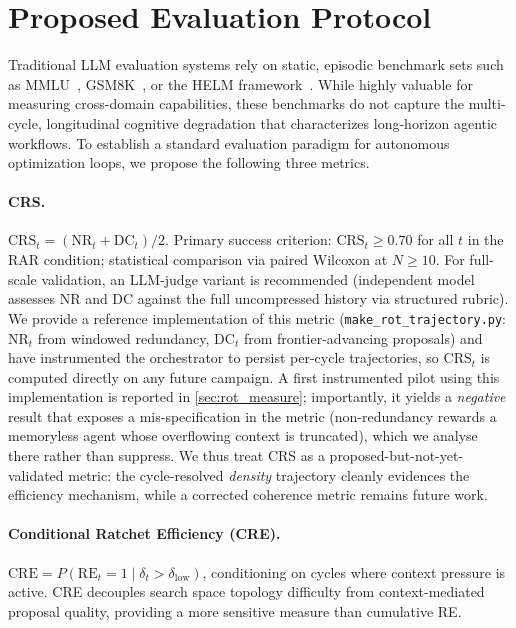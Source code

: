 \documentclass[conference]{IEEEtran}
\newcommand{\dlt}{\delta_t}
\newcommand{\dlow}{\delta_{\mathrm{low}}}
\newcommand{\CRS}{\mathrm{CRS}}
\newcommand{\RE}{\mathrm{RE}}
\newcommand{\NR}{\mathrm{NR}}
\newcommand{\DC}{\mathrm{DC}}
\newcommand{\CRE}{\mathrm{CRE}}
\begin{document}
\section{Proposed Evaluation Protocol}
\label{sec:eval}

Traditional LLM evaluation systems rely on static, episodic benchmark sets such as MMLU~\citep{hendrycks2020measuring}, GSM8K~\citep{cobbe2021training}, or the HELM framework~\citep{liang2022holistic}. While highly valuable for measuring cross-domain capabilities, these benchmarks do not capture the multi-cycle, longitudinal cognitive degradation that characterizes long-horizon agentic workflows. To establish a standard evaluation paradigm for autonomous optimization loops, we propose the following three metrics.

\paragraph{CRS.}
$\CRS_t = (\NR_t + \DC_t)/2$. Primary success criterion: $\CRS_t \geq 0.70$ for all $t$ in the RAR condition; statistical comparison via paired Wilcoxon at $N{\geq}10$. For full-scale validation, an LLM-judge variant is recommended (independent model assesses NR and DC against the full uncompressed history via structured rubric). We provide a reference implementation of this metric (\texttt{make\_rot\_trajectory.py}: $\NR_t$ from windowed redundancy, $\DC_t$ from frontier-advancing proposals) and have instrumented the orchestrator to persist per-cycle trajectories, so $\CRS_t$ is computed directly on any future campaign. A first instrumented pilot using this implementation is reported in \cref{sec:rot_measure}; importantly, it yields a \emph{negative} result that exposes a mis-specification in the metric (non-redundancy rewards a memoryless agent whose overflowing context is truncated), which we analyse there rather than suppress. We thus treat CRS as a proposed-but-not-yet-validated metric: the cycle-resolved \emph{density} trajectory cleanly evidences the efficiency mechanism, while a corrected coherence metric remains future work.

\paragraph{Conditional Ratchet Efficiency (CRE).}
$\CRE = P(\RE_t = 1 \mid \dlt > \dlow)$, conditioning on cycles where context pressure is active. CRE decouples search space topology difficulty from context-mediated proposal quality, providing a more sensitive measure than cumulative RE.
\end{document}
